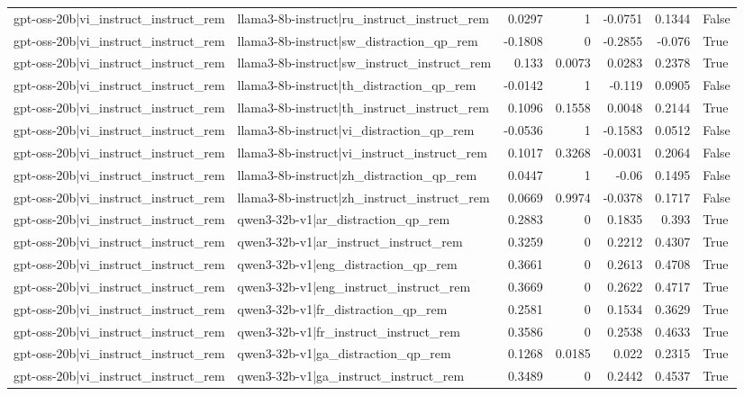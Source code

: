 \begin{table}
\begin{tabular}{l l r r r r l}
gpt-oss-20b|vi_instruct_instruct_rem & llama3-8b-instruct|ru_instruct_instruct_rem & 0.0297 & 1 & -0.0751 & 0.1344 & False \\
gpt-oss-20b|vi_instruct_instruct_rem & llama3-8b-instruct|sw_distraction_qp_rem & -0.1808 & 0 & -0.2855 & -0.076 & True \\
gpt-oss-20b|vi_instruct_instruct_rem & llama3-8b-instruct|sw_instruct_instruct_rem & 0.133 & 0.0073 & 0.0283 & 0.2378 & True \\
gpt-oss-20b|vi_instruct_instruct_rem & llama3-8b-instruct|th_distraction_qp_rem & -0.0142 & 1 & -0.119 & 0.0905 & False \\
gpt-oss-20b|vi_instruct_instruct_rem & llama3-8b-instruct|th_instruct_instruct_rem & 0.1096 & 0.1558 & 0.0048 & 0.2144 & True \\
gpt-oss-20b|vi_instruct_instruct_rem & llama3-8b-instruct|vi_distraction_qp_rem & -0.0536 & 1 & -0.1583 & 0.0512 & False \\
gpt-oss-20b|vi_instruct_instruct_rem & llama3-8b-instruct|vi_instruct_instruct_rem & 0.1017 & 0.3268 & -0.0031 & 0.2064 & False \\
gpt-oss-20b|vi_instruct_instruct_rem & llama3-8b-instruct|zh_distraction_qp_rem & 0.0447 & 1 & -0.06 & 0.1495 & False \\
gpt-oss-20b|vi_instruct_instruct_rem & llama3-8b-instruct|zh_instruct_instruct_rem & 0.0669 & 0.9974 & -0.0378 & 0.1717 & False \\
gpt-oss-20b|vi_instruct_instruct_rem & qwen3-32b-v1|ar_distraction_qp_rem & 0.2883 & 0 & 0.1835 & 0.393 & True \\
gpt-oss-20b|vi_instruct_instruct_rem & qwen3-32b-v1|ar_instruct_instruct_rem & 0.3259 & 0 & 0.2212 & 0.4307 & True \\
gpt-oss-20b|vi_instruct_instruct_rem & qwen3-32b-v1|eng_distraction_qp_rem & 0.3661 & 0 & 0.2613 & 0.4708 & True \\
gpt-oss-20b|vi_instruct_instruct_rem & qwen3-32b-v1|eng_instruct_instruct_rem & 0.3669 & 0 & 0.2622 & 0.4717 & True \\
gpt-oss-20b|vi_instruct_instruct_rem & qwen3-32b-v1|fr_distraction_qp_rem & 0.2581 & 0 & 0.1534 & 0.3629 & True \\
gpt-oss-20b|vi_instruct_instruct_rem & qwen3-32b-v1|fr_instruct_instruct_rem & 0.3586 & 0 & 0.2538 & 0.4633 & True \\
gpt-oss-20b|vi_instruct_instruct_rem & qwen3-32b-v1|ga_distraction_qp_rem & 0.1268 & 0.0185 & 0.022 & 0.2315 & True \\
gpt-oss-20b|vi_instruct_instruct_rem & qwen3-32b-v1|ga_instruct_instruct_rem & 0.3489 & 0 & 0.2442 & 0.4537 & True \\

\end{tabular}
\end{table}

